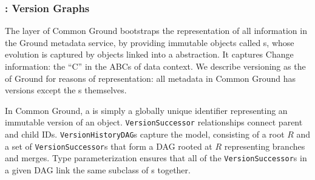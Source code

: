 \documentclass{sig-alternate}
\begin{document}

\subsubsection{\Core: Version Graphs}

The \core layer of Common Ground bootstraps the representation of all information in the Ground metadata service, by providing immutable objects called {\thing}s, whose evolution is captured by {\version} objects linked into a \emph{\versiongraph} abstraction. It captures Change information: the ``C'' in the ABCs of data context.  We describe versioning as the \core of Ground for reasons of representation: all metadata in Common Ground has versions except the {\versiongraph}s themselves.

In Common Ground, a \version is simply a globally unique identifier representing an immutable version of an object.
\texttt{VersionSuccessor} relationships connect parent and child \version IDs.
\texttt{VersionHistoryDAG}s capture the \versiongraph model, consisting of a root \version $R$ 
and a set of \texttt{VersionSuccessor}s that form a DAG rooted at $R$ 
representing branches and merges.
Type parameterization ensures that all of the \texttt{VersionSuccessor}s in a given DAG link the same subclass of {\version}s together.
\end{document}

